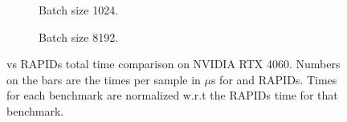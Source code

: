 \begin{figure}[ht]
  \centering
  \begin{subfigure}[b]{.45\textwidth}
    \caption{Batch size 1024.}
  \end{subfigure}
  \begin{subfigure}[b]{.45\textwidth}
    \caption{Batch size 8192.}
  \end{subfigure}
  \hfill
  \caption{\label{Fig:TotalTimeIndividualBenchmarks4060}\Treebeard{} vs RAPIDs total time comparison on NVIDIA RTX 4060. Numbers on the bars are the times 
  per sample in $\mu$s for \Treebeard{} and RAPIDs. Times for each benchmark are normalized w.r.t the RAPIDs time for that benchmark.}
\end{figure}

